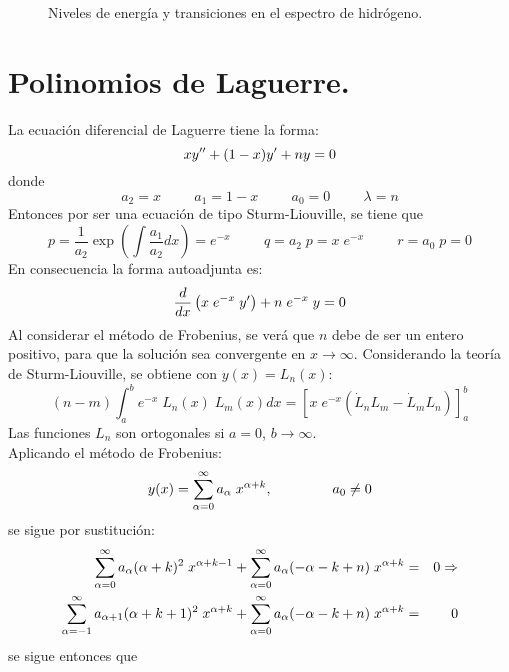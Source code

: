 \begin{figure}[H]
\centering

\caption{Niveles de energía y transiciones en el espectro de hidrógeno.}
\label{fig:figura_02}
\end{figure}
\newpage
\section{Polinomios de Laguerre.}
La ecuación diferencial de Laguerre tiene la forma:
\begin{equation}
x y^{\prime \prime} + (1 - x) y^{\prime} +  n y = 0
\label{eq:ecuacion_08_74}
\end{equation}
donde
\[ a_{2} = x \hspace{1cm} a_{1} = 1 - x \hspace{1cm} a_{0} = 0 \hspace{1cm} \lambda = n \]
Entonces por ser una ecuación de tipo Sturm-Liouville, se tiene que
\[ p = \dfrac{1}{a_{2}} \exp \left( \int \frac{a_{1}}{a_{2}} dx \right) = e^{-x} \hspace{1cm} q = a_{2} \; p = x \; e^{-x} \hspace{1cm} r =a_{0} \; p = 0 \]
En consecuencia la forma autoadjunta es:
\[ \dfrac{d}{dx} \left( x \; e^{-x} \; y^{\prime} \right) + n \; e^{-x} \;  y = 0  \]
Al considerar el método de Frobenius, se verá que $n$ debe de ser un entero positivo, para que la solución sea convergente en $x \to \infty$. Considerando la teoría de Sturm-Liouville, se obtiene con $y(x) = L_{n}(x)$:
\begin{equation}
(n - m) \int_{a}^{b} e^{-x} \; L_{n}(x) \; L_{m}(x) dx = \left[ x \; e^{-x} (\dot{L}_{n} L_{m} - \dot{L}_{m} L_{n}) \right]_{a}^{b}
\label{eq:ecuacion_08_75}
\end{equation}
Las funciones $L_{n}$ son ortogonales si $a=0$, $b \to \infty$.
\\
Aplicando el método de Frobenius:
\[ y(x) = \sum_{\alpha = 0}^{\infty} a_{\alpha} \; x^{\alpha + k}, \hspace{1.5cm} a_{0} \neq 0 \]
se sigue por sustitución:
\begin{eqnarray*}
\sum_{\alpha = 0}^{\infty} a_{\alpha} (\alpha + k)^{2} \; x^{\alpha + k - 1} + \sum_{\alpha = 0}^{\infty} a_{\alpha} (- \alpha - k + n) \; x^{\alpha + k} &=& 0 \Rightarrow \nonumber \\
\sum_{\alpha = -1}^{\infty} a_{\alpha + 1} (\alpha + k + 1)^{2} \; x^{\alpha + k} + \sum_{\alpha = 0}^{\infty} a_{\alpha} (- \alpha - k + n) \; x^{\alpha + k} &=& 0
\end{eqnarray*}
se sigue entonces que
